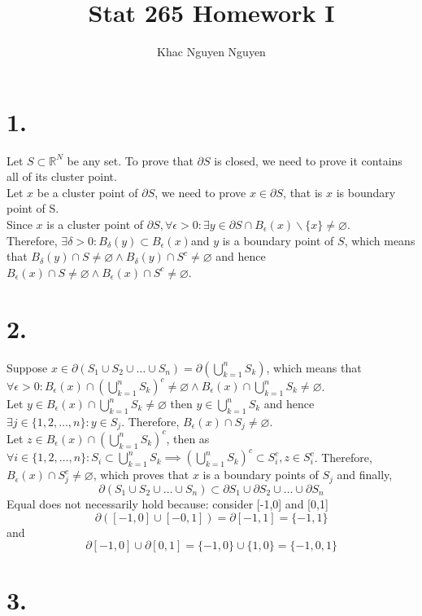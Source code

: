 \documentclass[11pt]{article}
\title{\textbf{Stat 265 Homework I}}
\author{Khac Nguyen Nguyen}
\date{}
\begin{document}
\section*{1.}
Let $S \subset \mathbb{R}^N$ be any set. To prove that $\partial S$ is closed, we need to prove it contains all of its cluster point.\\ 
Let $x$ be a cluster point of $\partial S$, we need to prove $x \in \partial S$, that is $x$ is boundary point of S. \\
Since $x$ is a cluster point of $\partial S,\forall \epsilon >0: \exists y \in \partial S \cap B_\epsilon(x) \backslash \{x\} \ne \varnothing$. \\
Therefore, $\exists \delta >0:B_\delta(y) \subset B_\epsilon(x) $and $y$ is a boundary point of $S$, which means that $B_\delta(y) \cap S \ne \varnothing \land B_\delta(y) \cap S^c \ne \varnothing$ and hence $B_\epsilon(x) \cap S \ne \varnothing \land B_\epsilon(x) \cap S^c \ne \varnothing$.
\pagebreak
\section*{2.}
Suppose $x \in \partial (S_1 \cup S_2 \cup \ldots \cup S_n) = \partial\left(\bigcup_{k=1}^n S_k\right)$, which means that $\forall \epsilon >0: B_\epsilon(x) \cap \left(\bigcup_{k=1}^n S_k\right)^c \ne \varnothing \land B_\epsilon(x) \cap \bigcup_{k=1}^n S_k \ne \varnothing$. \\
Let $y \in B_\epsilon(x) \cap \bigcup_{k=1}^n S_k \ne \varnothing$ then $y \in \bigcup_{k=1}^n S_k$ and hence \\
$\exists j \in \{1,2,\ldots, n\}: y \in S_j$. Therefore, $B_\epsilon(x) \cap S_j \ne \varnothing$.\\
Let $z \in B_\epsilon(x) \cap \left(\bigcup_{k=1}^n S_k\right)^c$, then as $\forall i \in \{1,2,\ldots, n\}: S_i \subset \bigcup_{k=1}^n S_k \implies \left(\bigcup_{k=1}^n S_k\right)^c \subset S_i^c, z \in S_i^c$. Therefore, $B_\epsilon(x) \cap S_j^c \ne \varnothing$, which proves that $x$ is a boundary points of $S_j$ and finally,
\[
\partial (S_1 \cup S_2 \cup \ldots \cup S_n) \subset \partial S_1 \cup \partial S_2 \cup \ldots \cup \partial S_n
\]
Equal does not necessarily hold because: consider [-1,0] and [0,1]
\[
\partial ([-1,0] \cup [-0,1]) = \partial [-1,1] = \{-1,1\}
\]
and
\[
\partial[-1,0] \cup \partial [0,1] = \{-1,0\} \cup \{1,0\} = \{-1,0,1\}
\]
\pagebreak
\section*{3.}
\end{document}
